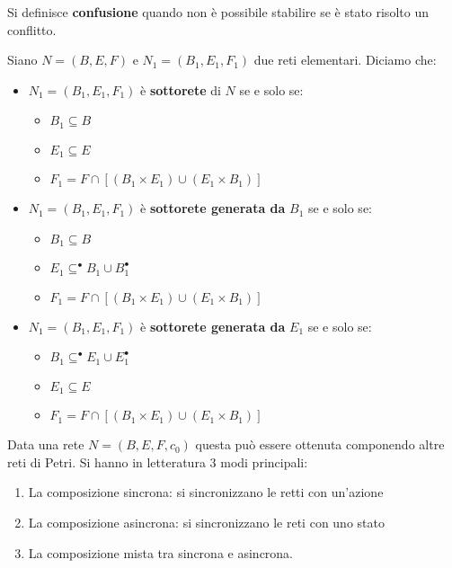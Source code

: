 Si definisce \textbf{confusione} quando non è possibile stabilire se è stato
risolto un conflitto.
\begin{definizione}
    Siano $N = (B, E, F)$ e $N_1 = (B_1, E_1, F_1)$ due reti elementari. Diciamo che:
    \begin{itemize}
        \item $N_1 = (B_1, E_1, F_1)$ è \textbf{sottorete} di $N$ se e solo se:
              \begin{itemize}
                  \item $B_1 \subseteq B$
                  \item $E_1 \subseteq E$
                  \item $F_1 = F \cap [(B_1 \times E_1) \cup (E_1 \times B_1)]$
              \end{itemize}
        \item $N_1 = (B_1, E_1, F_1)$ è \textbf{sottorete generata da} $B_1$ se e solo se:
              \begin{itemize}
                  \item $B_1 \subseteq B$
                  \item $E_1 \subseteq ^{\bullet} B_1 \cup B_1^{\bullet}$
                  \item $F_1 = F \cap [(B_1 \times E_1) \cup (E_1 \times B_1)]$
              \end{itemize}
        \item $N_1 = (B_1, E_1, F_1)$ è \textbf{sottorete generata da} $E_1$ se e solo se:
              \begin{itemize}
                  \item $B_1 \subseteq ^{\bullet} E_1 \cup E_1^{\bullet}$
                  \item $E_1 \subseteq E$
                  \item $F_1 = F \cap [(B_1 \times E_1) \cup (E_1 \times B_1)]$
              \end{itemize}
    \end{itemize}
\end{definizione}
Data una rete $N = (B,E, F, c_0)$ questa può essere ottenuta componendo altre
reti di Petri. Si hanno in letteratura 3 modi principali:
\begin{enumerate}
    \item La composizione sincrona: si sincronizzano le retti con un'azione
    \item La composizione asincrona: si sincronizzano le reti con uno stato
    \item La composizione mista tra sincrona e asincrona.
\end{enumerate}
